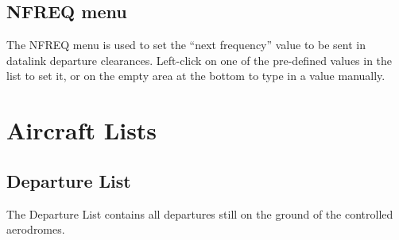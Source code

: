 \documentclass[a4paper,oneside,11pt]{memoir}
\begin{document}
\subsection{NFREQ menu}
\label{menu:nfreq}

The NFREQ menu is used to set the “next frequency” value to be sent in datalink departure clearances. Left-click on one of the pre-defined values in the list to set it, or on the empty area at the bottom to type in a value manually.

\section{Aircraft Lists}

\subsection{Departure List}\label{list:dep}

The Departure List contains all departures still on the ground of the controlled aerodromes.
\end{document}
